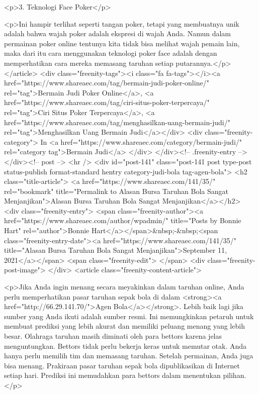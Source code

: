 <p>3. Teknologi Face Poker</p>



<p>Ini hampir terlihat seperti tangan poker, tetapi yang membuatnya unik adalah bahwa wajah poker adalah ekspresi di wajah Anda. Namun dalam permainan poker online tentunya kita tidak bisa melihat wajah pemain lain, maka dari itu cara menggunakan teknologi poker face adalah dengan memperhatikan cara mereka memasang taruhan setiap putarannya.</p>
									</article>
																			<div class="freenity-tags"><i class="fa fa-tags"></i><a href="https://www.shareaec.com/tag/bermain-judi-poker-online/" rel="tag">Bermain Judi Poker Online</a>, <a href="https://www.shareaec.com/tag/ciri-situs-poker-terpercaya/" rel="tag">Ciri Situs Poker Terpercaya</a>, <a href="https://www.shareaec.com/tag/menghasilkan-uang-bermain-judi/" rel="tag">Menghasilkan Uang Bermain Judi</a></div>
																			<div class="freenity-category">
											In <a href="https://www.shareaec.com/category/bermain-judi/" rel="category tag">Bermain Judi</a>										</div>
																	</div><!-- .freenity-entry -->
							</div><!-- post -->
							<hr />
													<div id="post-141" class="post-141 post type-post status-publish format-standard hentry category-judi-bola tag-agen-bola">
								<h2 class="title-article">
									<a href="https://www.shareaec.com/141/35/" rel="bookmark" title="Permalink to Alasan Bursa Taruhan Bola Sangat Menjanjikan">Alasan Bursa Taruhan Bola Sangat Menjanjikan</a></h2>
								<div class="freenity-entry">
									<span class="freenity-author"><a href="https://www.shareaec.com/author/wpadmin/" title="Posts by Bonnie Hart" rel="author">Bonnie Hart</a></span>&nbsp;-&nbsp;<span class="freenity-entry-date"><a href="https://www.shareaec.com/141/35/" title="Alasan Bursa Taruhan Bola Sangat Menjanjikan">September 11, 2021</a></span>
									<span class="freenity-edit"> </span>
									<div class="freenity-post-image">  </div>
																		<article class="freenity-content-article">
										
<p>Jika Anda ingin menang secara meyakinkan dalam taruhan online, Anda perlu memperhatikan pasar taruhan sepak bola di dalam <strong><a href="http://66.29.141.70/">Agen Bola</a></strong>. Lebih baik lagi jika sumber yang Anda ikuti adalah sumber resmi. Ini memungkinkan petaruh untuk membuat prediksi yang lebih akurat dan memiliki peluang menang yang lebih besar. Olahraga taruhan masih diminati oleh para bettors karena jelas menguntungkan. Bettors tidak perlu bekerja keras untuk memutar otak. Anda hanya perlu memilih tim dan memasang taruhan. Setelah permainan, Anda juga bisa menang. Prakiraan pasar taruhan sepak bola dipublikasikan di Internet setiap hari. Prediksi ini memudahkan para bettors dalam menentukan pilihan.</p>



